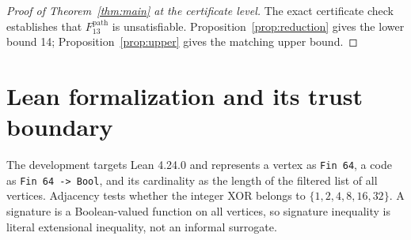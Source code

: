\documentclass[11pt]{article}
\begin{document}
\begin{proof}[Proof of Theorem~\ref{thm:main} at the certificate level]
The exact certificate check establishes that $F_{13}^{\mathrm{path}}$ is unsatisfiable. Proposition~\ref{prop:reduction} gives the lower bound 14; Proposition~\ref{prop:upper} gives the matching upper bound.
\end{proof}

\section{Lean formalization and its trust boundary}\label{sec:formal}
The development targets Lean 4.24.0 and represents a vertex as \texttt{Fin 64}, a code as \texttt{Fin 64 -> Bool}, and its cardinality as the length of the filtered list of all vertices. Adjacency tests whether the integer XOR belongs to $\{1,2,4,8,16,32\}$. A signature is a Boolean-valued function on all vertices, so signature inequality is literal extensional inequality, not an informal surrogate.
\end{document}
